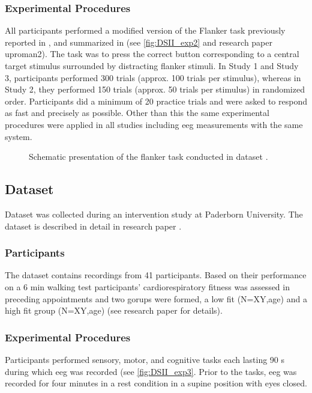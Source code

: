\subsubsection{Experimental Procedures}
\label{methods:datasets:II:experiment}
All participants performed a modified version of the Flanker task previously reported in \cite{Reuter2017, Winneke2012, Winneke2019}, and summarized in \cite{Reuter2019} (see \autoref{fig:DSII_exp2} and research paper uproman{2}). The task was to press the correct button corresponding to a central target stimulus surrounded by distracting flanker stimuli. In Study 1 and Study 3, participants performed 300 trials (approx. 100 trials per stimulus), whereas in Study 2, they performed 150 trials (approx. 50 trials per stimulus) in randomized order. Participants did a minimum of 20 practice trials and were asked to respond as fast and precisely as possible. Other than this the same experimental procedures were applied in all studies including \gls{eeg} measurements with the same system. 

\begin{figure}[h]
\begin{center}

\caption[Schematic presentation of the flanker task conducted in dataset .]{Schematic presentation of the flanker task conducted in dataset .}
\label{fig:DSII_exp2}
\end{center}
\end{figure}

\subsection{Dataset }
\label{methods:datasets:III}
Dataset  was collected during an intervention study at Paderborn University. The dataset is described in detail in research paper  \cite{Goelz2021b}. 

\subsubsection{Participants}
\label{methods:datasets:III:participants}
The dataset contains recordings from 41 participants. Based on their performance on a 6 min walking test participants’ cardiorespiratory fitness was assessed in preceding appointments and two gorups were formed, a low fit (N=XY,age) and a high fit group (N=XY,age) (see research paper  \cite{Goelz2021b} for details).

\subsubsection{Experimental Procedures}
\label{methods:datasets:II:experiment}
Participants performed sensory, motor, and cognitive tasks each lasting 90 s during which \gls{eeg} was recorded (see \autoref{fig:DSII_exp3}. Prior to the tasks, \gls{eeg} was recorded for four minutes in a rest condition in a supine position with eyes closed. 
